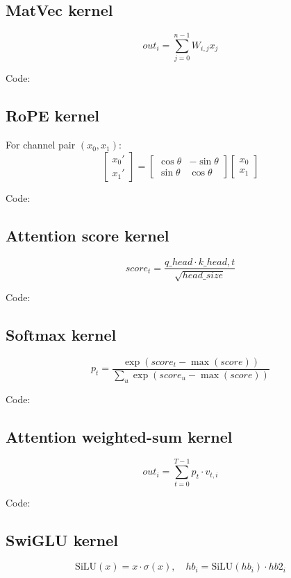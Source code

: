 \documentclass[11pt]{article}
\begin{document}
\subsection{MatVec kernel}
\[
out_i = \sum_{j=0}^{n-1} W_{i,j} x_j
\]

Code:


\subsection{RoPE kernel}
For channel pair \((x_0,x_1)\):
\[
\begin{bmatrix}x_0'\\x_1'\end{bmatrix}
=
\begin{bmatrix}\cos\theta & -\sin\theta\\ \sin\theta & \cos\theta\end{bmatrix}
\begin{bmatrix}x_0\\x_1\end{bmatrix}
\]

Code:


\subsection{Attention score kernel}
\[
score_t = \frac{q\_{head}\cdot k\_{head,t}}{\sqrt{head\_size}}
\]

Code:


\subsection{Softmax kernel}
\[
p_t = \frac{\exp(score_t - \max(score))}{\sum_u \exp(score_u - \max(score))}
\]

Code:


\subsection{Attention weighted-sum kernel}
\[
out_i = \sum_{t=0}^{T-1} p_t \cdot v_{t,i}
\]

Code:


\subsection{SwiGLU kernel}
\[
\mathrm{SiLU}(x)=x\cdot\sigma(x),\quad hb_i = \mathrm{SiLU}(hb_i)\cdot hb2_i
\]
\end{document}
